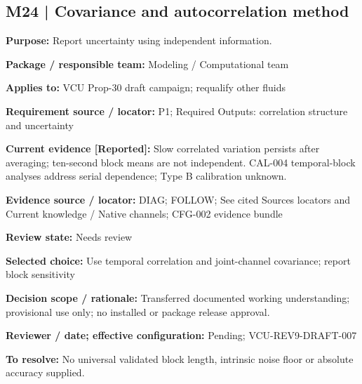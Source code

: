 \documentclass[11pt]{article}
\begin{document}
\par\noindent\begin{minipage}{\textwidth}\small\setlength{\parskip}{2pt}
\subsection*{M24 | Covariance and autocorrelation method}
\textbf{Purpose:} Report uncertainty using independent information.\par
\textbf{Package / responsible team:} Modeling / Computational team\par
\textbf{Applies to:} VCU Prop-30 draft campaign; requalify other fluids\par
\textbf{Requirement source / locator:} P1; Required Outputs: correlation structure and uncertainty\par
\textbf{Current evidence [Reported]:} Slow correlated variation persists after averaging; ten-second block means are not independent. CAL-004 temporal-block analyses address serial dependence; Type B calibration unknown.\par
\textbf{Evidence source / locator:} DIAG; FOLLOW; See cited Sources locators and Current knowledge / Native channels; CFG-002 evidence bundle\par
\textbf{Review state:} Needs review\par
\textbf{Selected choice:} Use temporal correlation and joint-channel covariance; report block sensitivity\par
\textbf{Decision scope / rationale:} Transferred documented working understanding; provisional use only; no installed or package release approval.\par
\textbf{Reviewer / date; effective configuration:} Pending; VCU-REV9-DRAFT-007\par
\textbf{To resolve:} No universal validated block length, intrinsic noise floor or absolute accuracy supplied.\par
\end{minipage}\par\vspace{5pt}
\end{document}
